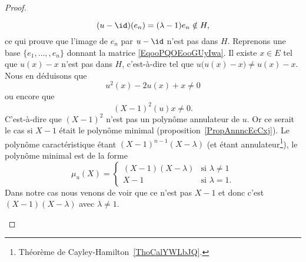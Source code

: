 \begin{proof}
\begin{subproof}
		\begin{equation}
			(u-\id)(e_n)=(\lambda-1)e_n\notin H,
		\end{equation}
		ce qui prouve que l'image de \( e_n\) par \( u-\id\) n'est pas dans \( H\).
		Reprenons une base \( \{ e_1,\ldots, ,e_n \}\) donnant la matrice \eqref{EqooPQOEooGUyIwa}. Il existe \( x\in E\) tel que \( u(x)-x\) n'est pas dans \( H\), c'est-à-dire tel que \( u\big( u(x)-x \big)\neq u(x)-x\). Nous en déduisons que
		\begin{equation}
			u^2(x)-2u(x)+x\neq 0
		\end{equation}
		ou encore que
		\begin{equation}
			(X-1)^2(u)x\neq 0.
		\end{equation}
		C'est-à-dire que \( (X-1)^2\) n'est pas un polynôme annulateur de \( u\). Or ce serait le cas si \( X-1\) était le polynôme minimal (proposition~\ref{PropAnnncEcCxj}). Le polynôme caractéristique étant \( (X-1)^{n-1}(X-\lambda)\) (et étant annulateur\footnote{Théorème de Cayley-Hamilton~\ref{ThoCalYWLbJQ}.}), le polynôme minimal est de la forme
		\begin{equation}
			\mu_u(X)=\begin{cases}
				(X-1)(X-\lambda) & \text{si } \lambda\neq 1 \\
				X-1              & \text{si } \lambda=1.
			\end{cases}
		\end{equation}
		Dans notre cas nous venons de voir que ce n'est pas \( X-1\) et donc c'est \( (X-1)(X-\lambda)\) avec \( \lambda\neq 1\).


\end{subproof}
\end{proof}
